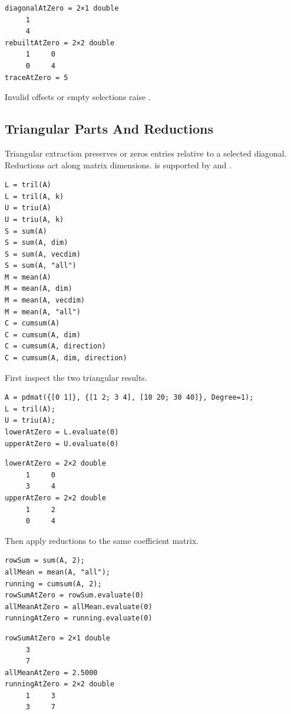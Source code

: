 \begin{lstlisting}[style=dpoutput]
diagonalAtZero = 2×1 double
     1
     4
rebuiltAtZero = 2×2 double
     1     0
     0     4
traceAtZero = 5
\end{lstlisting}

Invalid offsets or empty selections raise .

\subsection{Triangular Parts And Reductions}
\label{sec:pdmat-matrix-reductions}

Triangular extraction preserves or zeros entries relative to a selected diagonal.  Reductions act along matrix dimensions.  is supported by  and .

\syntaxhead
\begin{lstlisting}[style=dpsyntax]
L = tril(A)
L = tril(A, k)
U = triu(A)
U = triu(A, k)
S = sum(A)
S = sum(A, dim)
S = sum(A, vecdim)
S = sum(A, "all")
M = mean(A)
M = mean(A, dim)
M = mean(A, vecdim)
M = mean(A, "all")
C = cumsum(A)
C = cumsum(A, dim)
C = cumsum(A, direction)
C = cumsum(A, dim, direction)
\end{lstlisting}

First inspect the two triangular results.

\examplehead
\begin{lstlisting}[style=dpmatlab]
A = pdmat({[0 1]}, {[1 2; 3 4], [10 20; 30 40]}, Degree=1);
L = tril(A);
U = triu(A);
lowerAtZero = L.evaluate(0)
upperAtZero = U.evaluate(0)
\end{lstlisting}

\begin{lstlisting}[style=dpoutput]
lowerAtZero = 2×2 double
     1     0
     3     4
upperAtZero = 2×2 double
     1     2
     0     4
\end{lstlisting}

Then apply reductions to the same coefficient matrix.

\begin{lstlisting}[style=dpmatlab]
rowSum = sum(A, 2);
allMean = mean(A, "all");
running = cumsum(A, 2);
rowSumAtZero = rowSum.evaluate(0)
allMeanAtZero = allMean.evaluate(0)
runningAtZero = running.evaluate(0)
\end{lstlisting}

\begin{lstlisting}[style=dpoutput]
rowSumAtZero = 2×1 double
     3
     7
allMeanAtZero = 2.5000
runningAtZero = 2×2 double
     1     3
     3     7
\end{lstlisting}

